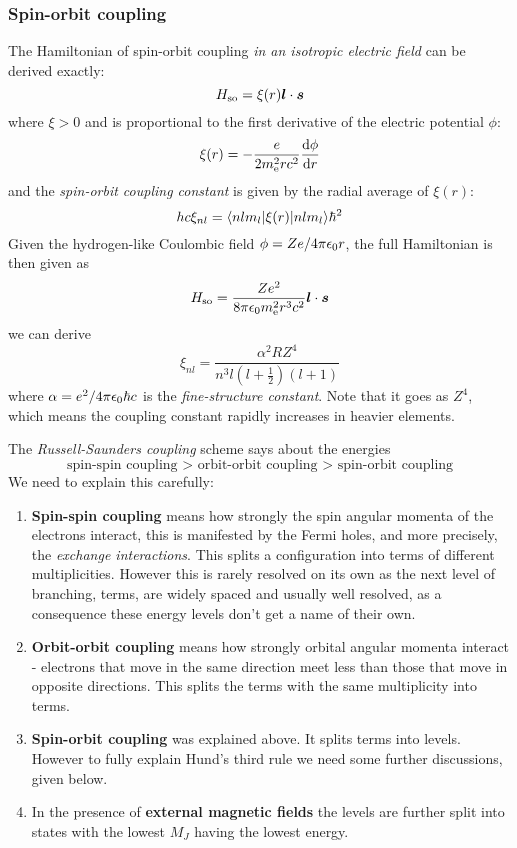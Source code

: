 \subsubsection{Spin-orbit coupling}
The Hamiltonian of spin-orbit coupling \emph{in an isotropic electric field} can be derived exactly:
\begin{equation}
	H_{\mathrm{so}}=\xi(r)\boldsymbol{l}\cdot\boldsymbol{s}
\end{equation}
where $\xi>0$ and is proportional to the first derivative of the electric potential $\phi$:
\begin{equation}
	\xi(r)=-\frac{e}{2m_{\mathrm{e}}^2rc^2}\diff{\phi}{r}
\end{equation}
and the \emph{spin-orbit coupling constant} is given by the radial average of $\xi(r)$:
\begin{equation}
	hc\xi_{nl}=\langle nlm_l|\xi(r) |nlm_l  \rangle\hbar^2
\end{equation}
Given the hydrogen-like Coulombic field $\phi=Ze/4\pi\epsilon_0r$, the full Hamiltonian is then given as
\begin{equation}
\label{sochamil}
H_{\mathrm{so}}=\frac{Ze^2}{8\pi\epsilon_0m_{\mathrm{e}}^2r^3c^2}\boldsymbol{l}\cdot\boldsymbol{s} 	
\end{equation} 
we can derive
\begin{equation}
\label{xinl}
	\xi_{nl}=\frac{\alpha^2RZ^4}{n^3l(l+\tfrac{1}{2})(l+1)}
\end{equation}
where $\alpha=e^2/4\pi\epsilon_0\hbar c$ is the \emph{fine-structure constant}. Note that it goes as $Z^4$, which means the coupling constant rapidly increases in heavier elements.\par
The \emph{Russell-Saunders coupling} scheme says about the energies
\begin{equation*}
\text{spin-spin coupling > orbit-orbit coupling > spin-orbit coupling}
\end{equation*}
We need to explain this carefully:
\begin{enumerate}
	\item \textbf{Spin-spin coupling} means how strongly the spin angular momenta of the electrons interact, this is manifested by the Fermi holes, and more precisely, the \emph{exchange interactions}. This splits a configuration into terms of different multiplicities. However this is rarely resolved on its own as the next level of branching, terms, are widely spaced and usually well resolved, as a consequence these energy levels don't get a name of their own.
	\item \textbf{Orbit-orbit coupling} means how strongly orbital angular momenta interact - electrons that move in the same direction meet less than those that move in opposite directions. This splits the terms with the same multiplicity into terms.
	\item \textbf{Spin-orbit coupling} was explained above. It splits terms into levels. However to fully explain Hund's third rule we need some further discussions, given below.
	\item In the presence of \textbf{external magnetic fields} the levels are further split into states with the lowest $M_J$ having the lowest energy.
\end{enumerate}
